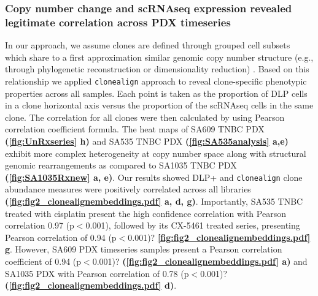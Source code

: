 \subsubsection{Copy number change and scRNAseq expression revealed legitimate correlation across PDX timeseries}
  In our approach, we assume clones are defined through grouped cell subsets which share to a first approximation similar genomic copy number structure (e.g., through phylogenetic reconstruction or dimensionality reduction) \cite{laks2019clonal}. Based on this relationship we applied
  \texttt{clonealign} approach \cite{campbell2019clonealign} to reveal clone-specific phenotypic properties across all samples.
  Each point is taken as the proportion of DLP cells in a clone horizontal axis versus the proportion of the scRNAseq cells in the same clone. The  correlation for all clones were then calculated by using Pearson correlation coefficient formula. The heat maps of SA609 TNBC PDX \textbf{(\autoref{fig:UnRxseries} h)} and SA535 TNBC PDX \textbf{(\autoref{fig:SA535analysis} a,e)} exhibit more complex heterogeneity at copy number space along with structural genomic rearrangements as compared to SA1035 TNBC PDX \textbf{(\autoref{fig:SA1035Rxnew} a, e)}. Our results showed DLP+ and \texttt{clonealign} clone abundance measures were positively correlated across all libraries \textbf{(\autoref{fig:fig2_clonealignembeddings.pdf} a, d, g)}. Importantly, SA535 TNBC treated with cisplatin present the high confidence correlation with Pearson correlation 0.97 (p$<$0.001), followed by its CX-5461 treated series, presenting Pearson correlation of 0.94 (p$<$0.001)? \textbf{\autoref{fig:fig2_clonealignembeddings.pdf} g}. However, SA609 PDX timeseries samples present a Pearson correlation coefficient of 0.94 (p$<$0.001)? \textbf{(\autoref{fig:fig2_clonealignembeddings.pdf} a)} and SA1035 PDX with Pearson correlation of 0.78 (p$<$0.001)? \textbf{(\autoref{fig:fig2_clonealignembeddings.pdf} d)}.
  
  

